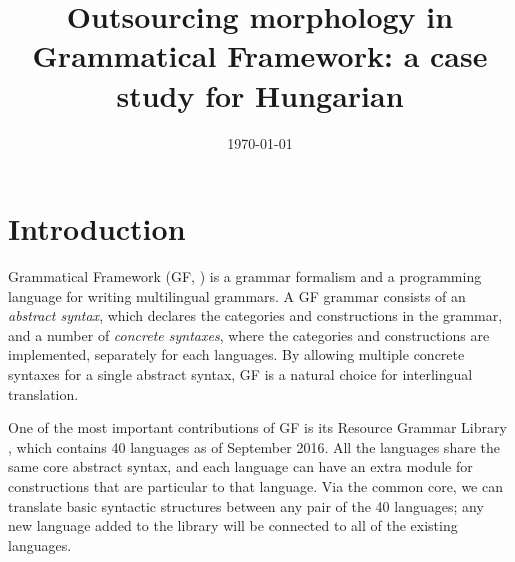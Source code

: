 \documentclass[10pt,a4paper]{article}
\begin{document}
\date{\today}
\title{Outsourcing morphology in Grammatical Framework: a case study for Hungarian}
\address{Department of Computer Science and Engineering \\ University of Gothenburg and Chalmers University of Technology \\ \tt inari@chalmers.se}



\maketitleabstract


\section{Introduction}
\label{sec:introduction}
Grammatical Framework (GF, \cite{ranta2004jfp}) is a grammar formalism and a programming 
language for writing multilingual grammars.
A GF grammar consists of an \emph{abstract syntax}, which declares the
categories and constructions in the grammar, and a number of \emph{concrete
  syntaxes}, where the categories and constructions are implemented,
separately for each languages.
By allowing multiple concrete syntaxes for a single abstract syntax, GF is a natural 
choice for interlingual translation.

One of the most important contributions of GF is its Resource Grammar Library 
\cite{ranta2009lilt}, which contains 40 languages as of September 2016. All the languages 
share the same core abstract syntax, and each language can have an extra module for 
constructions that are particular to that language. Via the common core, we can 
translate basic syntactic structures between any pair of the 40 languages; any new 
language added to the library will be connected to all of the existing languages.
\end{document}
